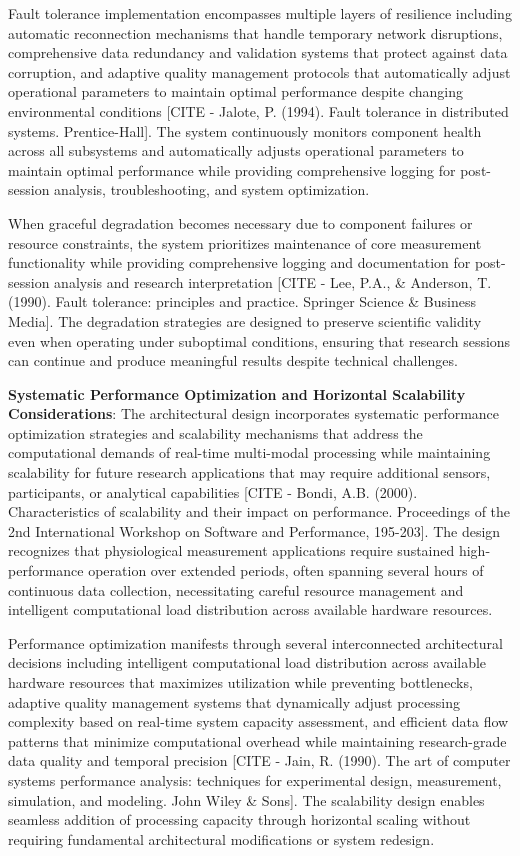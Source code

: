 \documentclass[11pt,a4paper]{report}
\begin{document}
Fault tolerance implementation encompasses multiple layers of resilience including automatic reconnection mechanisms
that handle temporary network disruptions, comprehensive data redundancy and validation systems that protect against
data corruption, and adaptive quality management protocols that automatically adjust operational parameters to maintain
optimal performance despite changing environmental
conditions [CITE - Jalote, P. (1994). Fault tolerance in distributed systems. Prentice-Hall]. The system continuously
monitors component health across all subsystems and automatically adjusts operational parameters to maintain optimal
performance while providing comprehensive logging for post-session analysis, troubleshooting, and system optimization.

When graceful degradation becomes necessary due to component failures or resource constraints, the system prioritizes
maintenance of core measurement functionality while providing comprehensive logging and documentation for post-session
analysis and research
interpretation [CITE - Lee, P.A., \& Anderson, T. (1990). Fault tolerance: principles and practice. Springer Science \& Business Media].
The degradation strategies are designed to preserve scientific validity even when operating under suboptimal conditions,
ensuring that research sessions can continue and produce meaningful results despite technical challenges.

\textbf{Systematic Performance Optimization and Horizontal Scalability Considerations}: The architectural design incorporates
systematic performance optimization strategies and scalability mechanisms that address the computational demands of
real-time multi-modal processing while maintaining scalability for future research applications that may require
additional sensors, participants, or analytical
capabilities [CITE - Bondi, A.B. (2000). Characteristics of scalability and their impact on performance. Proceedings of the 2nd International Workshop on Software and Performance, 195-203].
The design recognizes that physiological measurement applications require sustained high-performance operation over
extended periods, often spanning several hours of continuous data collection, necessitating careful resource management
and intelligent computational load distribution across available hardware resources.

Performance optimization manifests through several interconnected architectural decisions including intelligent
computational load distribution across available hardware resources that maximizes utilization while preventing
bottlenecks, adaptive quality management systems that dynamically adjust processing complexity based on real-time system
capacity assessment, and efficient data flow patterns that minimize computational overhead while maintaining
research-grade data quality and temporal
precision [CITE - Jain, R. (1990). The art of computer systems performance analysis: techniques for experimental design, measurement, simulation, and modeling. John Wiley \& Sons].
The scalability design enables seamless addition of processing capacity through horizontal scaling without requiring
fundamental architectural modifications or system redesign.
\end{document}
